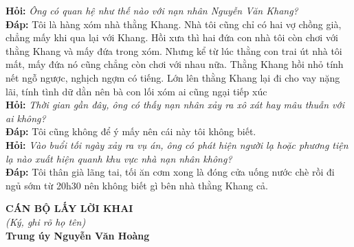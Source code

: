 \documentclass[12pt,a4paper]{article}
\begin{document}
\noindent\textbf{Hỏi:} \textit{Ông có quan hệ như thế nào với nạn nhân Nguyễn Văn Khang?}\\[0.15cm]
\noindent\textbf{Đáp:} Tôi là hàng xóm nhà thằng Khang. Nhà tôi cũng chỉ có hai vợ chồng già, chẳng mấy khi qua lại với Khang. Hồi xưa thì hai đứa con nhà tôi còn chơi với thằng Khang và mấy đứa trong xóm. Nhưng kể từ lúc thằng con trai út nhà tôi mất, mấy đứa nó cũng chẳng còn chơi với nhau nữa. Thằng Khang hồi nhỏ tính nết ngỗ ngược, nghịch ngợm có tiếng.  Lớn lên thằng Khang lại đi cho vay nặng lãi, tính tình dữ dằn nên bà con lối xóm ai cũng ngại tiếp xúc\\[0.35cm]
\noindent\textbf{Hỏi:} \textit{Thời gian gần đây, ông có thấy nạn nhân xảy ra xô xát hay mâu thuẫn với ai không?}\\[0.15cm]
\noindent\textbf{Đáp:} Tôi cũng không để ý mấy nên cái này tôi không biết.\\[0.35cm]
\noindent\textbf{Hỏi:} \textit{Vào buổi tối ngày xảy ra vụ án, ông có phát hiện người lạ hoặc phương tiện lạ nào xuất hiện quanh khu vực nhà nạn nhân không?}\\[0.15cm]
\noindent\textbf{Đáp:} Tôi thân già lãng tai, tối ăn cơm xong là đóng cửa uống nước chè rồi đi ngủ sớm từ 20h30 nên không biết gì bên nhà thằng Khang cả.\\[0.35cm]
\vspace{0.8cm}
\noindent
\hfill
\begin{minipage}[t]{0.50\textwidth}
    \begin{center}
        \textbf{CÁN BỘ LẤY LỜI KHAI}\\[0.1cm]
        \textit{(Ký, ghi rõ họ tên)}\\[1.6cm]
        \textbf{Trung úy Nguyễn Văn Hoàng}
    \end{center}
\end{minipage}
\end{document}
